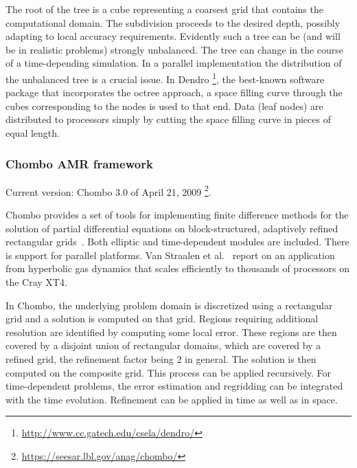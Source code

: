 \documentclass[11pt,pdftex]{article}
\begin{document}
\begin{enumerate}
  The root of the tree is a cube representing a coarsest grid that
  contains the computational domain.  The subdivision proceeds to the
  desired depth, possibly adapting to local accuracy requirements.
  Evidently such a tree can be (and will be in realistic problems)
  strongly unbalanced.  The tree can change in the course of a
  time-depending simulation.  In a parallel implementation the
  distribution of the unbalanced tree is a crucial issue.  In \textsf{Dendro}%
  \footnote{\url{http://www.cc.gatech.edu/csela/dendro/}}, the
  best-known software package that incorporates the octree approach, a
  space filling curve through the cubes corresponding to the nodes is
  used to that end.  Data (leaf nodes) are distributed to processors
  simply by cutting the space filling curve in pieces of equal length.

\end{enumerate}


\subsubsection{\textsf{Chombo} AMR framework}

Current version: \textsf{Chombo} 3.0 of April 21, 2009%
\footnote{\url{https://seesar.lbl.gov/anag/chombo/}}.

Chombo provides a set of tools for implementing finite difference
methods for the solution of partial differential equations on
block-structured, adaptively refined rectangular
grids~\cite{chombo-design}.  Both elliptic and time-dependent modules
are included.  There is support for parallel platforms.  Van Straalen et
al.~\cite{vslk:09} report on an application from hyperbolic gas dynamics
that scales efficiently to thousands of processors on the Cray XT4.

In Chombo, the underlying problem domain is discretized using a
rectangular grid and a solution is computed on that grid.  Regions
requiring additional resolution are identified by computing some local
error.  These regions are then covered by a disjoint union of
rectangular domains, which are covered by a refined grid, the refinement
factor being 2 in general.  The solution is then computed on the
composite grid.  This process can be applied recursively.  For
time-dependent problems, the error estimation and regridding can be
integrated with the time evolution.  Refinement can be applied in time
as well as in space.
\end{document}
